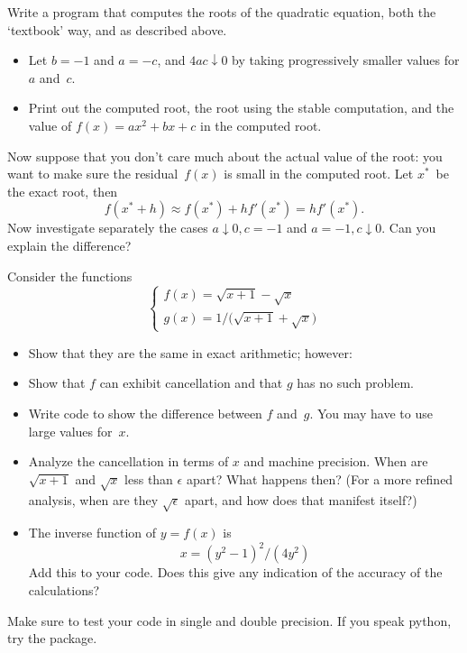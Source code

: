 \begin{exercise}
  Write a program that computes the roots of the quadratic equation, both
  the `textbook' way, and as described above. 
  \begin{itemize}
  \item Let $b=-1$ and $a=-c$, and $4ac\downarrow 0$ by taking progressively smaller
    values for $a$ and~$c$.
  \item Print out the computed root, the root using the stable computation,
    and the value of $f(x)=ax^2+bx+c$ in the computed root.
  \end{itemize}
  Now suppose that you don't care much about the actual value of the root:
  you want to make sure the residual~$f(x)$ is small in the computed root.
  Let $x^*$~be the exact root, then
  \begin{equation}
    f(x^*+h)\approx f(x^*)+hf'(x^*) = hf'(x^*).
  \end{equation}
  Now investigate separately the cases $a\downarrow 0,c=-1$ and $a=-1,c\downarrow0$.
  Can you explain the difference?
\end{exercise}

\begin{exercise}
  Consider the functions
  \begin{equation}
  \begin{cases}
    f(x) = \sqrt{x+1}-\sqrt{x}\\
    g(x) = 1/\bigl(\sqrt{x+1}+\sqrt{x}\bigr)
  \end{cases}
  \end{equation}
  \begin{itemize}
  \item Show that they are the same in exact arithmetic; however:
  \item Show that $f$ can exhibit cancellation and that $g$ has no such problem.
  \item Write code to show the difference between $f$ and~$g$. You may
    have to use large values for~$x$.
  \item Analyze the cancellation in terms of $x$ and machine
    precision.  When are $\sqrt{x+1}$ and $\sqrt{x}$ less than
    $\epsilon$ apart?  What happens then? (For a more refined
    analysis, when are they $\sqrt\epsilon$ apart, and how does that
    manifest itself?)
  \item The inverse function of $y=f(x)$ is
    \begin{equation}
      x = (y^2-1)^2 / (4y^2)
    \end{equation}
    Add this to your code. Does this give any indication of the
    accuracy of the calculations?
  \end{itemize}
  Make sure to test your code in single and double precision.
  If you speak python, try the  package.
\end{exercise}

